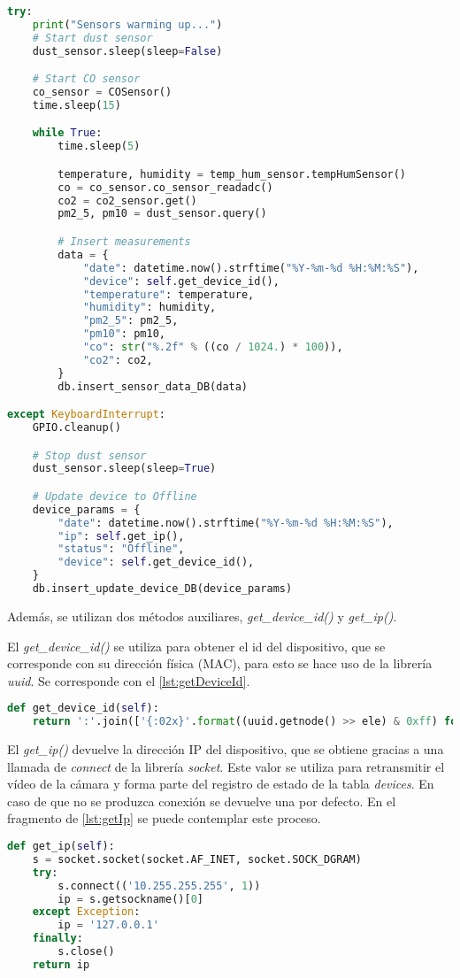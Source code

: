\begin{lstlisting}[language=Python, label=lst:metodoPrincipal, caption=Método start del programa principal]
try:
    print("Sensors warming up...")
    # Start dust sensor
    dust_sensor.sleep(sleep=False)

    # Start CO sensor
    co_sensor = COSensor()
    time.sleep(15)

    while True:
        time.sleep(5)

        temperature, humidity = temp_hum_sensor.tempHumSensor()
        co = co_sensor.co_sensor_readadc()
        co2 = co2_sensor.get()
        pm2_5, pm10 = dust_sensor.query()

        # Insert measurements
        data = {
            "date": datetime.now().strftime("%Y-%m-%d %H:%M:%S"),
            "device": self.get_device_id(),
            "temperature": temperature,
            "humidity": humidity,
            "pm2_5": pm2_5,
            "pm10": pm10,
            "co": str("%.2f" % ((co / 1024.) * 100)),
            "co2": co2,
        }
        db.insert_sensor_data_DB(data)

except KeyboardInterrupt:
    GPIO.cleanup()

    # Stop dust sensor
    dust_sensor.sleep(sleep=True)

    # Update device to Offline
    device_params = {
        "date": datetime.now().strftime("%Y-%m-%d %H:%M:%S"),
        "ip": self.get_ip(),
        "status": "Offline",
        "device": self.get_device_id(),
    }
    db.insert_update_device_DB(device_params)
\end{lstlisting}
\pagebreak

Además, se utilizan dos métodos auxiliares, \textit{get\_device\_id()} y \textit{get\_ip()}.  

El \textit{get\_device\_id()} se utiliza para obtener el id del dispositivo, que se corresponde con su dirección física (MAC), para esto se hace uso de la librería \textit{uuid}. Se corresponde con el \autoref{lst:getDeviceId}.
\begin{lstlisting}[language=Python, label=lst:getDeviceId, caption=Método get\_device\_id()]
def get_device_id(self):
    return ':'.join(['{:02x}'.format((uuid.getnode() >> ele) & 0xff) for ele in range(0, 8 * 6, 8)][::-1])
\end{lstlisting}

El \textit{get\_ip()} devuelve la dirección IP del dispositivo, que se obtiene gracias a una llamada de \textit{connect} de la librería \textit{socket}. Este valor se utiliza para retransmitir el vídeo de la cámara y forma parte del registro de estado de la tabla \textit{devices}. En caso de que no se produzca conexión se devuelve una por defecto. En el fragmento de \autoref{lst:getIp} se puede contemplar este proceso.
\begin{lstlisting}[language=Python, label=lst:getIp,caption=Método get\_ip()]
def get_ip(self):
    s = socket.socket(socket.AF_INET, socket.SOCK_DGRAM)
    try:
        s.connect(('10.255.255.255', 1))
        ip = s.getsockname()[0]
    except Exception:
        ip = '127.0.0.1'
    finally:
        s.close()
    return ip
\end{lstlisting}
